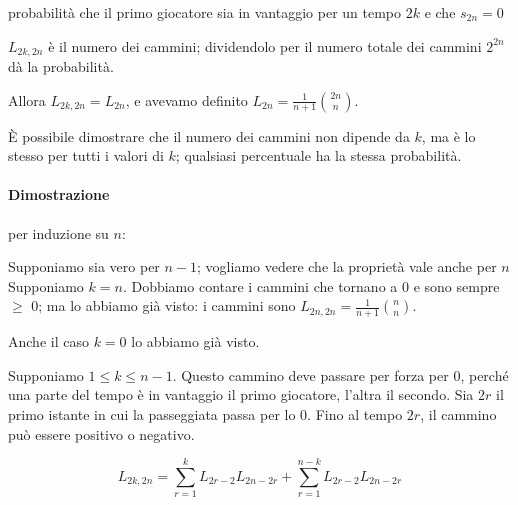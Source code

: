 \documentclass[a4paper,12pt]{book}
\newcommand\ddfrac[2]{\frac{\displaystyle #1}{\displaystyle #2}}
\begin{document}
 { probabilità che il primo giocatore  sia in vantaggio per un tempo $ 2k $ e che $ s_{2n} = 0 $}

$ L_{2k, 2n} $ è il numero dei cammini; dividendolo per il numero totale dei cammini $ 2^{2n} $ dà la probabilità. 

Allora $ L_{2k, 2n} = L_{2n} $, e avevamo definito $ L_{2n} = \ddfrac{1}{n+1}	\binom{\displaystyle 2n}{\displaystyle n} $.

È possibile dimostrare che il numero dei cammini non dipende da $ k $, ma è lo stesso per tutti i valori di $ k $; qualsiasi percentuale ha la stessa probabilità.

\paragraph{Dimostrazione} per induzione su $ n $:
\begin{multicols}{2}
	
	
	Supponiamo sia vero per $ n-1 $; vogliamo vedere che la proprietà vale anche per $ n $
	Supponiamo $ k = n $. Dobbiamo contare i cammini che tornano a 0 e sono sempre $ \ge $ 0; ma lo abbiamo già visto: i cammini sono $ L_{2n, 2n} = \ddfrac{1}{n+1}\binom{\displaystyle n}{\displaystyle n} $.


	Anche il caso $ k = 0 $ lo abbiamo già visto. 
	
\end{multicols}

Supponiamo $ 1 \le k \le n-1 $. Questo cammino deve passare per forza per 0, perché una parte del tempo è in vantaggio il primo giocatore, l'altra il secondo. Sia $ 2r $ il primo istante in cui la passeggiata passa per lo 0. Fino al tempo $ 2r $, il cammino può essere positivo o negativo. 

$$ L_{2k,2n} = \sum_{r=1}^{k} L_{2r-2} L_{2n-2r} + \sum_{r=1}^{n-k} L_{2r-2} L_{2n-2r}$$
\end{document}
